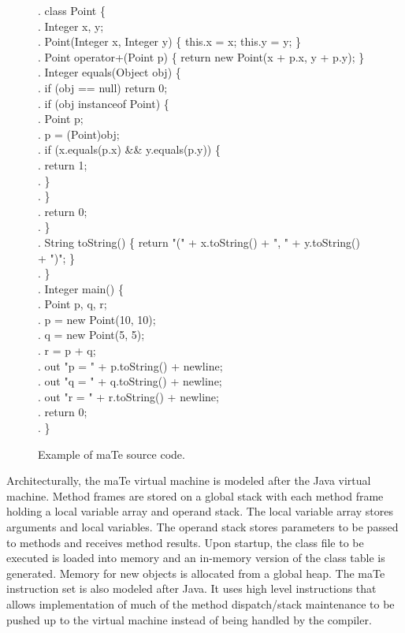 \begin{figure}[!]
\begin{small}
  \small \bnncode
  \codeln. class Point \{ \\
  \codeln. \> Integer x, y; \\
  \codeln. \> Point(Integer x, Integer y) \{ this.x = x; this.y = y; \} \\
  \codeln. \> Point operator+(Point p) \{ return new Point(x + p.x, y + p.y); \} \\
  \codeln. \> Integer equals(Object obj) \{ \\
  \codeln. \>\> if (obj == null) return 0; \\
  \codeln. \>\> if (obj instanceof Point) \{ \\
  \codeln. \>\>\> Point p; \\
  \codeln. \>\>\> p = (Point)obj; \\
  \codeln. \>\>\> if (x.equals(p.x) \&\& y.equals(p.y)) \{ \\
  \codeln. \>\>\>\> return 1; \\
  \codeln. \>\>\> \} \\
  \codeln. \>\> \} \\
  \codeln. \>\> return 0; \\
  \codeln. \> \} \\
  \codeln. \> String toString() \{ return "(" + x.toString() + ", " + y.toString() + ")"; \} \\
  \codeln.  \} \\
  \codeln. Integer main() \{ \\
  \codeln. \> Point p, q, r; \\
  \codeln. \> p = new Point(10, 10); \\
  \codeln. \> q = new Point(5, 5); \\
  \codeln. \> r = p + q; \\
  \codeln. \> out "p = " + p.toString() + newline; \\
  \codeln. \> out "q = " + q.toString() + newline; \\
  \codeln. \> out "r = " + r.toString() + newline; \\
  \codeln. \> return 0; \\
  \codeln. \}
  \ecode \vspace{-0mm}
  \caption{\label{fig:mate-code} Example of maTe source code.}
\end{small}
\end{figure}

Architecturally, the maTe virtual machine is modeled after the Java
virtual machine.  Method frames are stored on a global stack with each
method frame holding a local variable array and operand stack.  The
local variable array stores arguments and local variables.  The
operand stack stores parameters to be passed to methods and receives
method results.  Upon startup, the class file to be executed is loaded
into memory and an in-memory version of the class table is generated.
Memory for new objects is allocated from a global heap.  The maTe
instruction set is also modeled after Java.  It uses high level
instructions that allows implementation of much of the method
dispatch/stack maintenance to be pushed up to the virtual machine
instead of being handled by the compiler.

